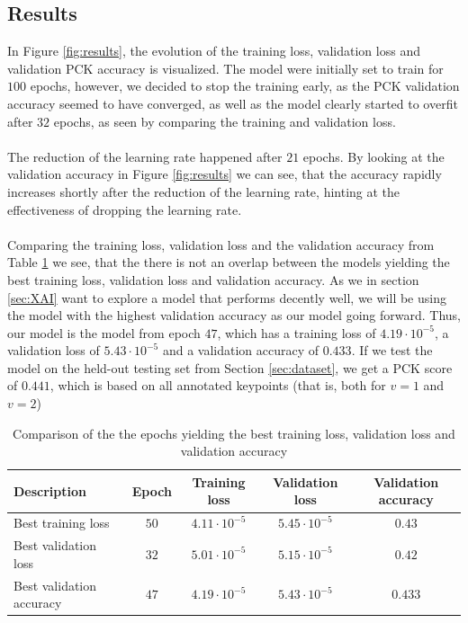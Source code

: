 \documentclass[./main.tex]{subfiles}
\begin{document}
\subsection{Results}\label{subsec:results}
In Figure \ref{fig:results}, the evolution of the training loss, validation loss and validation PCK accuracy is visualized. The model were initially set to train for $100$ epochs, however, we decided to stop the training early, as the PCK validation accuracy seemed to have converged, as well as the model clearly started to overfit after $32$ epochs, as seen by comparing the training and validation loss.
\\
\\
The reduction of the learning rate happened after $21$ epochs. By looking at the validation accuracy in Figure \ref{fig:results} we can see, that the accuracy rapidly increases shortly after the reduction of the learning rate, hinting at the effectiveness of dropping the learning rate. 
\\
\\
Comparing the training loss, validation loss and the validation accuracy from Table \ref{tab:results} we see, that the there is not an overlap between the models yielding the best training loss, validation loss and validation accuracy. As we in section \ref{sec:XAI} want to explore a model that performs decently well, we will be using the model with the highest validation accuracy as our model going forward. Thus, our model is the model from epoch $47$, which has a training loss of $4.19 \cdot 10^{-5}$, a validation loss of $5.43 \cdot 10^{-5}$ and a validation accuracy of $0.433$. If we test the model on the held-out testing set from Section \ref{sec:dataset}, we get a PCK score of $0.441$, which is based on all annotated keypoints (that is, both for $v = 1$ and $v = 2$)
\begin{table}[b]
    \centering
    \begin{tabular}{|l|c|c|c|c|}
        \hline
        \textbf{Description} & \textbf{Epoch} & \textbf{Training loss} & \textbf{Validation loss} & \textbf{Validation accuracy} \\
        \hline
        Best training loss & $50$ & $4.11 \cdot 10^{-5}$ & $5.45 \cdot 10^{-5}$ & $0.43$ \\
        \hline
        Best validation loss & $32$ & $5.01 \cdot 10^{-5}$ & $5.15 \cdot 10^{-5}$ & $0.42$ \\
        \hline
        Best validation accuracy & $47$ & $4.19 \cdot 10^{-5}$ & $5.43 \cdot 10^{-5}$  & $0.433$ \\
        \hline
    \end{tabular}
    \caption{Comparison of the the epochs yielding the best training loss, validation loss and validation accuracy}
    \label{tab:results}
\end{table}
\end{document}
